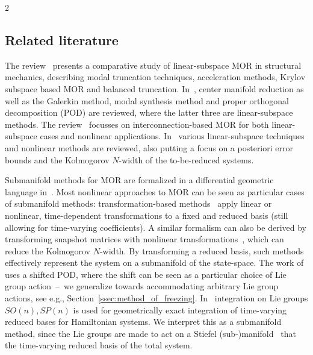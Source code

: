 \documentclass{article}
\begin{document}
\begin{multicols}{2}
\subsection{Related literature}
The review~\cite{Besselink2013} presents a comparative study of linear-subspace MOR in structural mechanics, describing modal truncation techniques, acceleration methods, Krylov subspace based MOR and balanced truncation. 
In~\cite{Lu2021}, center manifold reduction as well as the Galerkin method, modal synthesis method and proper orthogonal decomposition (POD) are reviewed, where the latter three are linear-subspace methods. 
The review~\cite{Scarciotti2024} focusses on interconnection-based MOR for both linear-subspace cases and nonlinear applications.
In~\cite{Ohlberger2016} various linear-subspace techniques and nonlinear methods are reviewed, also putting a focus on a posteriori error bounds and the Kolmogorov $N$-width of the to-be-reduced systems. %

Submanifold methods for MOR are formalized in a differential geometric language in~\cite{Buchfink2023a}. Most nonlinear approaches to MOR can be seen as particular cases of submanifold methods: transformation-based methods~\cite{Cagniart2019,Cagniart2020_thesis,Black2020,Schulze2023} apply linear or nonlinear, time-dependent transformations to a fixed and reduced basis (still allowing for time-varying coefficients). A similar formalism can also be derived by transforming snapshot matrices with nonlinear transformations~\cite{Taddei2020}, which can reduce the Kolmogorov $N$-width. By transforming a reduced basis, such methods effectively represent the system on a submanifold of the state-space. %
The work of~\cite{Reiss2018,Krah2025} uses a shifted POD, where the shift can be seen as a particular choice of Lie group action~--~we generalize towards accommodating arbitrary Lie group actions, see e.g., Section~\ref{ssec:method_of_freezing}.
In~\cite{Pagliantini2021} integration on Lie groups $SO(n), SP(n)$ is used for geometrically exact integration of time-varying reduced bases for Hamiltonian systems. We interpret this as a submanifold method, since the Lie groups are made to act on a Stiefel (sub-)manifold~\cite{Feppon2018} that the time-varying reduced basis of the total system.  %


\end{multicols}
\end{document}
